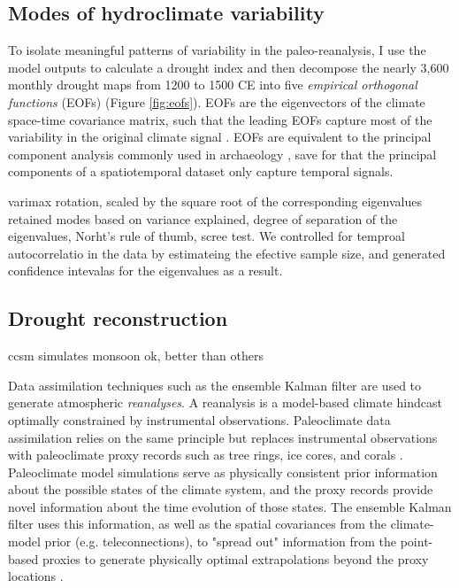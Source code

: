 \documentclass[fleqn,10pt]{wlscirep}
\begin{document}
\subsection*{Modes of hydroclimate variability}
To isolate meaningful patterns of variability in the paleo-reanalysis, I use the model outputs to calculate a drought index and then decompose the nearly 3,600 monthly drought maps from 1200 to 1500 CE into five \textit{empirical orthogonal functions} (EOFs) (Figure \ref{fig:eofs}). EOFs are the eigenvectors of the climate space-time covariance matrix, such that the leading EOFs capture most of the variability in the original climate signal \cite{Lorenz1956EmpiricalPrediction}. EOFs are equivalent to the principal component analysis commonly used in archaeology \cite[e.g.]{Dean1996DemographyStress}, save for that the principal components of a spatiotemporal dataset only capture temporal signals.

varimax rotation, scaled by the square root of the corresponding eigenvalues
retained modes based on variance explained, degree of separation of the eigenvalues, Norht's rule of thumb, scree test. We controlled for temproal autocorrelatio in the data by estimateing the efective sample size, and generated confidence intevalas for the eigenvalues as a result.

\subsection*{Drought reconstruction}
ccsm simulates monsoon ok, better than others

Data assimilation techniques such as the ensemble Kalman filter are used to generate atmospheric \textit{reanalyses}. A reanalysis is a model-based climate hindcast optimally constrained by instrumental observations. Paleoclimate data assimilation relies on the same principle but replaces instrumental observations with paleoclimate proxy records such as tree rings, ice cores, and corals \cite{Hakim2016TheResults}. Paleoclimate model simulations serve as physically consistent prior information about the possible states of the climate system, and the proxy records provide novel information about the time evolution of those states. The ensemble Kalman filter uses this information, as well as the spatial covariances from the climate-model prior (e.g. teleconnections), to "spread out" information from the point-based proxies to generate physically optimal extrapolations beyond the proxy locations \cite{Acevedo2015TowardsTechniques,Hakim2016TheResults}.
\end{document}
